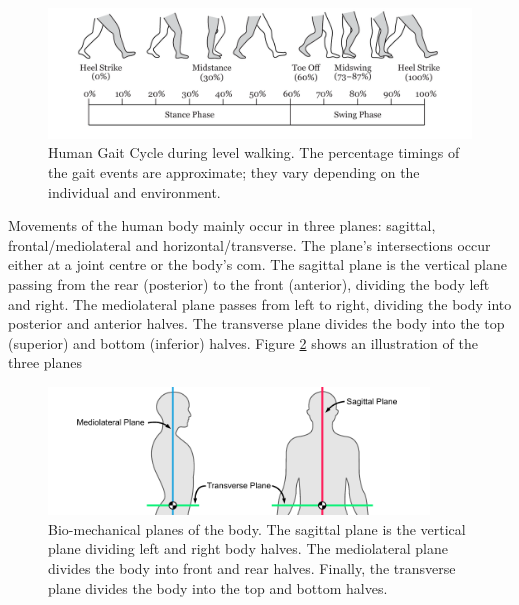 \begin{figure}[!hbt]
    \centering
    \includegraphics[width=\textwidth]{content/4-LSTM_Behaviour/Gait_Cycle.pdf}
    \caption[Human Gait Cycle during level walking]{Human Gait Cycle during level walking. The percentage timings of the gait events are approximate; they vary depending on the individual and environment.\cite{Sherratt2021}}
    \label{fig:background_gait_cycle}
\end{figure}

Movements of the human body mainly occur in three planes: sagittal, frontal/mediolateral and horizontal/transverse. The plane's intersections occur either at a joint centre or the body's \acrfull{com}. The sagittal plane is the vertical plane passing from the rear (posterior) to the front (anterior), dividing the body left and right. The mediolateral plane passes from left to right, dividing the body into posterior and anterior halves. The transverse plane divides the body into the top (superior) and bottom (inferior) halves.\cite{Bartlett2007} Figure \ref{fig:background_planes_of_the_body} shows an illustration of the three planes

\begin{figure}[!hbt]
    \centering
    \includegraphics[width=0.9\textwidth]{content/2-Background/body_planes.pdf}
    \caption[Bio-mechanical planes of the body]{Bio-mechanical planes of the body. The sagittal plane is the vertical plane dividing left and right body halves. The mediolateral plane divides the body into front and rear halves. Finally, the transverse plane divides the body into the top and bottom halves.}
    \label{fig:background_planes_of_the_body}
\end{figure}

